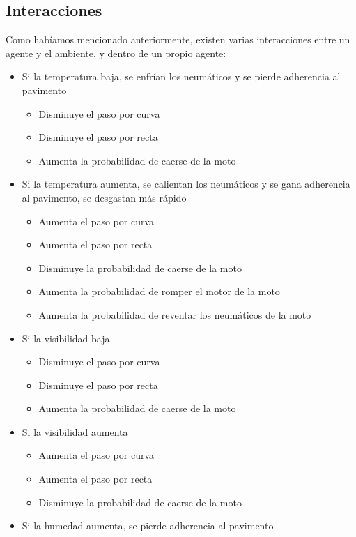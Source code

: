 \documentclass[12pt, letterpaper,spanish]{article}
\theoremstyle{definition}
\theoremstyle{remark}
\begin{document}
	\subsection{Interacciones}
	Como habíamos mencionado anteriormente, existen varias interacciones entre un agente y el ambiente, y dentro de un propio agente:
	\begin{itemize}
		\item Si la temperatura baja, se enfrían los neumáticos y se pierde adherencia al pavimento
		\begin{itemize}
			\item Disminuye el paso por curva
			\item Disminuye el paso por recta
			\item Aumenta la probabilidad de caerse de la moto
		\end{itemize} 
		\item Si la temperatura aumenta, se calientan los neumáticos y se gana adherencia al pavimento, se desgastan más rápido
		\begin{itemize}
			\item Aumenta el paso por curva
			\item Aumenta el paso por recta
			\item Disminuye la probabilidad de caerse de la moto
			\item Aumenta la probabilidad de romper el motor de la moto
			\item Aumenta la probabilidad de reventar los neumáticos de la moto
		\end{itemize}
		\item Si la visibilidad baja
		\begin{itemize}
			\item Disminuye el paso por curva
			\item Disminuye el paso por recta
			\item Aumenta la probabilidad de caerse de la moto
		\end{itemize}
		\item Si la visibilidad aumenta
		\begin{itemize}
			\item Aumenta el paso por curva
			\item Aumenta el paso por recta
			\item Disminuye la probabilidad de caerse de la moto
		\end{itemize}
		\item Si la humedad aumenta, se pierde adherencia al pavimento
		\begin{itemize}

\end{itemize}
\end{itemize}
\end{document}
